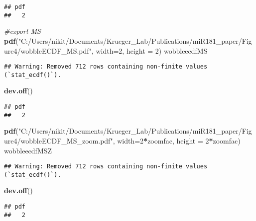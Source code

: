 \documentclass[
]{article}
\newenvironment{Shaded}{\begin{snugshade}}{\end{snugshade}}
\newcommand{\AttributeTok}[1]{\textcolor[rgb]{0.13,0.29,0.53}{#1}}
\newcommand{\CommentTok}[1]{\textcolor[rgb]{0.56,0.35,0.01}{\textit{#1}}}
\newcommand{\DecValTok}[1]{\textcolor[rgb]{0.00,0.00,0.81}{#1}}
\newcommand{\FunctionTok}[1]{\textcolor[rgb]{0.13,0.29,0.53}{\textbf{#1}}}
\newcommand{\NormalTok}[1]{#1}
\newcommand{\SpecialCharTok}[1]{\textcolor[rgb]{0.81,0.36,0.00}{\textbf{#1}}}
\newcommand{\StringTok}[1]{\textcolor[rgb]{0.31,0.60,0.02}{#1}}
\begin{document}
\begin{verbatim}
## pdf 
##   2
\end{verbatim}

\begin{Shaded}
\begin{Highlighting}[]
\CommentTok{\#export MS}
\FunctionTok{pdf}\NormalTok{(}\StringTok{"C:/Users/nikit/Documents/Krueger\_Lab/Publications/miR181\_paper/Figure4/wobbleECDF\_MS.pdf"}\NormalTok{, }\AttributeTok{width=}\DecValTok{2}\NormalTok{, }\AttributeTok{height =} \DecValTok{2}\NormalTok{)}
\NormalTok{wobbleecdfMS}
\end{Highlighting}
\end{Shaded}

\begin{verbatim}
## Warning: Removed 712 rows containing non-finite values (`stat_ecdf()`).
\end{verbatim}

\begin{Shaded}
\begin{Highlighting}[]
\FunctionTok{dev.off}\NormalTok{()}
\end{Highlighting}
\end{Shaded}

\begin{verbatim}
## pdf 
##   2
\end{verbatim}

\begin{Shaded}
\begin{Highlighting}[]
\FunctionTok{pdf}\NormalTok{(}\StringTok{"C:/Users/nikit/Documents/Krueger\_Lab/Publications/miR181\_paper/Figure4/wobbleECDF\_MS\_zoom.pdf"}\NormalTok{, }\AttributeTok{width=}\DecValTok{2}\SpecialCharTok{*}\NormalTok{zoomfac, }\AttributeTok{height =} \DecValTok{2}\SpecialCharTok{*}\NormalTok{zoomfac)}
\NormalTok{wobbleecdfMSZ}
\end{Highlighting}
\end{Shaded}

\begin{verbatim}
## Warning: Removed 712 rows containing non-finite values (`stat_ecdf()`).
\end{verbatim}

\begin{Shaded}
\begin{Highlighting}[]
\FunctionTok{dev.off}\NormalTok{()}
\end{Highlighting}
\end{Shaded}

\begin{verbatim}
## pdf 
##   2
\end{verbatim}
\end{document}
